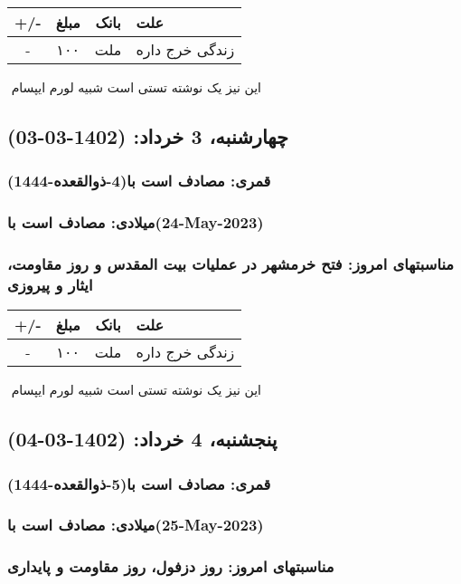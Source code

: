 \documentclass{article}
\newcommand{\rnote}[1]{\marginpar{\textcolor{color}{\StrSubstitute{\##1}{ }{\_}}}}
\newcommand{\myRow}[4]{
    #1 & #2 & #3 & #4 \\ \hline
}
\begin{document}
\begin{tabular}{ | c | c | c | p{5cm} |}
    \hline
    \myRow{ +/- }{مبلغ}{بانک}{علت}
    \myRow{-}{۱۰۰}{ملت}{زندگی خرج داره}
\end{tabular}
\newline
\newline

‌
\rnote{تست}
این نیز یک نوشته تستی است شبیه لورم ایپسام




\newpage
{}
\textcolor{color}{
\section{ چهارشنبه، 3 خرداد: (1402-03-03) }
\subsubsection*{قمری: مصادف است با(4-ذوالقعده-1444)} 
\subsubsection*{میلادی: مصادف است با(24-May-2023)}
\subsubsection*{مناسبتهای امروز: فتح خرمشهر در عملیات بیت المقدس و روز مقاومت، ایثار و پیروزی}
}


\begin{tabular}{ | c | c | c | p{5cm} |}
    \hline
    \myRow{ +/- }{مبلغ}{بانک}{علت}
    \myRow{-}{۱۰۰}{ملت}{زندگی خرج داره}
\end{tabular}
\newline
\newline

‌
\rnote{تست}
این نیز یک نوشته تستی است شبیه لورم ایپسام




\newpage
{}
\textcolor{color}{
\section{ پنجشنبه، 4 خرداد: (1402-03-04) }
\subsubsection*{قمری: مصادف است با(5-ذوالقعده-1444)} 
\subsubsection*{میلادی: مصادف است با(25-May-2023)}
\subsubsection*{مناسبتهای امروز: روز دزفول، روز مقاومت و پایداری}
}
\end{document}
